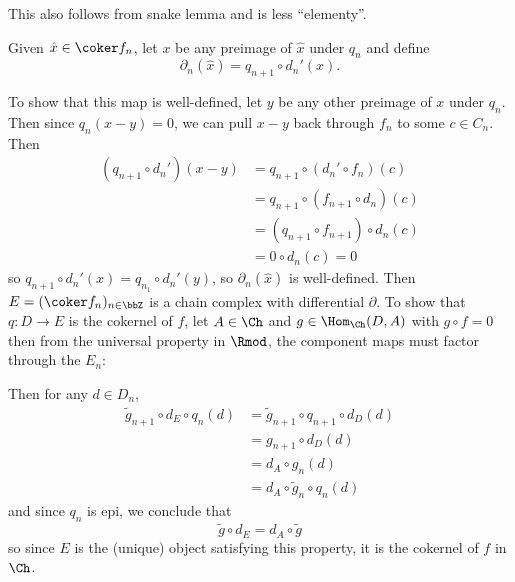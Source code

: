 \documentclass[12pt]{article}
\begin{document}
\begin{sol}
\begin{prf}
	\begin{center}
	\end{center}

	\begin{rmk}
		This also follows from snake lemma and is less ``elementy''.
	\end{rmk}
	Given $\hat x\in\coker f_n$, let $x$ be any preimage of $\hat x$ under $q_n$ and define
	\[\partial_n(\hat x)=q_{n+1}\circ d_n'(x).\]

	To show that this map is well-defined, let $y$ be any other preimage of $x$ under $q_n$.
	Then since $q_n(x-y)=0$, we can pull $x-y$ back through $f_n$ to some $c\in C_n$. Then
	\begin{align*}
		(q_{n+1}\circ d_n')(x-y)&=q_{n+1}\circ (d_n'\circ f_n)(c)\\
		&=q_{n+1}\circ(f_{n+1}\circ d_n)(c)\\
		&=(q_{n+1}\circ f_{n+1})\circ d_n(c)\\
		&=0\circ d_n(c)=0
	\end{align*}
	so $q_{n+1}\circ d_n'(x)=q_{n_1}\circ d_n'(y)$, so $\partial_n(\hat x)$ is well-defined. Then 
	$E=(\coker f_n)_{n\in\bbZ}$ is a chain complex with differential $\partial$. To show that $q:D\to E$ 
	is the cokernel of $f$, let $A\in\Ch$ and $g\in\Hom_{\Ch}(D,A)$  with $g\circ f = 0$ then from the universal property in 
	$\Rmod$, the component maps must factor through the $E_n$:

	\begin{center}
	\end{center}

	Then for any $d\in D_n$, 
	\begin{align*}
		\tilde g_{n+1}\circ d_E\circ q_n(d) &= \tilde g_{n+1}\circ q_{n+1}\circ d_D(d)\\
		&= g_{n+1}\circ d_D(d)\\
		&= d_A\circ g_n(d)\\
		&= d_A\circ \tilde g_n\circ q_n(d)
	\end{align*}
	and since $q_n$ is epi, we conclude that 
	\[\tilde g\circ d_E=d_A\circ \tilde g\]
	so since $E$ is the (unique) object satisfying this property, it is the cokernel of $f$ in $\Ch$.
	\end{prf}
\end{sol}
\end{document}
